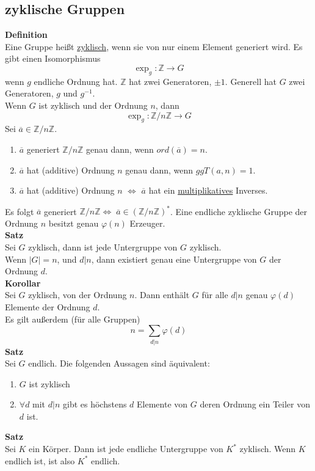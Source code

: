 \documentclass[a4paper, 12pt]{article}
\begin{document}
\subsection{zyklische Gruppen}
\textbf{Definition}\\
Eine Gruppe heißt \underline{zyklisch}, wenn sie von nur einem Element generiert wird. Es gibt einen Isomorphismus \[\exp_g: \mathbb{Z} \to G\] wenn $g$ endliche Ordnung hat. $\mathbb{Z}$ hat zwei Generatoren, $\pm1$. Generell hat $G$ zwei Generatoren, $g$ und $g^{-1}$.\\
Wenn $G$ ist zyklisch und der Ordnung $n$, dann \[\exp_g: \mathbb{Z}/n\mathbb{Z} \to G\]
Sei $\overline{a} \in \mathbb{Z}/n\mathbb{Z}$. \begin{enumerate}
	\item $\overline{a}$ generiert $\mathbb{Z}/n\mathbb{Z}$ genau dann, wenn $ord(\overline{a}) = n$.
	\item $\overline{a}$ hat (additive) Ordnung $n$ genau dann, wenn $ggT(a,n)=1$.
	\item $\overline{a}$ hat (additive) Ordnung $n$ $\Leftrightarrow$ $\overline{a}$ hat ein \underline{multiplikatives} Inverses. 
\end{enumerate}
Es folgt $\overline{a}$ generiert $\mathbb{Z}/n\mathbb{Z} \Leftrightarrow \; \overline{a} \in (\mathbb{Z}/n\mathbb{Z})^*$. Eine endliche zyklische Gruppe der Ordnung $n$ besitzt genau $\varphi(n)$ Erzeuger.\\
\textbf{Satz}\\
Sei $G$ zyklisch, dann ist jede Untergruppe von $G$ zyklisch.\\
Wenn $\left|G\right|=n$, und $d|n$, dann existiert genau eine Untergruppe von $G$ der Ordnung $d$.\\
\textbf{Korollar}\\
Sei $G$ zyklisch, von der Ordnung $n$. Dann enthält $G$ für alle $d|n$ genau $\varphi(d)$ Elemente der Ordnung $d$.\\
Es gilt außerdem (für alle Gruppen) \[n = \sum_{d|n} \varphi(d)\]
\textbf{Satz}\\
Sei $G$ endlich. Die folgenden Aussagen sind äquivalent:\begin{enumerate}
	\item $G$ ist zyklisch
	\item $\forall d$ mit $d|n$ gibt es höchstens $d$ Elemente von $G$ deren Ordnung ein Teiler von $d$ ist. 
\end{enumerate}
\textbf{Satz}\\
Sei $K$ ein Körper. Dann ist jede endliche Untergruppe von $K^*$ zyklisch. Wenn $K$ endlich ist, ist also $K^*$ endlich.\\
\end{document}

